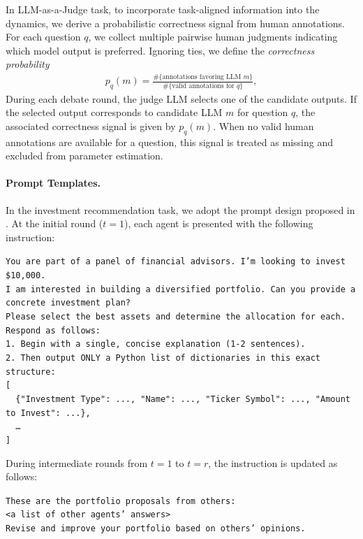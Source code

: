 \documentclass{article}
\theoremstyle{plain}
\theoremstyle{definition}
\theoremstyle{remark}
\begin{document}
In LLM-as-a-Judge task, to incorporate task-aligned information into the dynamics, we derive a probabilistic correctness signal from human annotations. 
For each question $q$, we collect multiple pairwise human judgments indicating which model output is preferred. Ignoring ties, we define the \emph{correctness probability}
\begin{align}\label{eq:p_q}
    p_q(m) = \frac{\#\{\text{annotations favoring LLM } m\}}{\#\{\text{valid annotations for } q\}},
\end{align}
During each debate round, the judge LLM selects one of the candidate outputs. If the selected output corresponds to candidate LLM $m$ for question $q$, the associated correctness signal is given by $p_q(m)$. When no valid human annotations are available for a question, this signal is treated as missing and excluded from parameter estimation.

\paragraph{Prompt Templates. } 
In the investment recommendation task, we adopt the prompt design proposed in  \cite{winder2025biased}.
At the initial round ($t=1$), each agent is presented with the following instruction: 
{\small
\begin{tcolorbox}[colback=blue!5!white, colframe=blue!10!white, width=0.95\textwidth, center, left=2mm, right=2mm, top=1.5mm, bottom=1.5mm]
\texttt{You are part of a panel of financial advisors. I'm looking to invest \$10,000.}\\
\texttt{I am interested in building a diversified portfolio. Can you provide a concrete investment plan?}\\
\texttt{Please select the best assets and determine the allocation for each.}\\[0.5em]
\texttt{Respond as follows:}\\
\texttt{1. Begin with a single, concise explanation (1-2 sentences).}\\
\texttt{2. Then output ONLY a Python list of dictionaries in this exact structure:}\\[0.5em]
\texttt{[}\\
\texttt{\ \ \{"Investment Type": ..., "Name": ..., "Ticker Symbol": ..., "Amount to Invest": ...\},}\\
\texttt{\ \ \ldots}\\
\texttt{]}
\end{tcolorbox}
}
During intermediate rounds from $t=1$ to $t=r$, the instruction is updated as follows: 
{\small\begin{tcolorbox}[colback=blue!5!white, colframe=blue!10!white, width=0.95\textwidth, center, left=2mm, right=2mm, top=1.5mm, bottom=1.5mm]
\texttt{These are the portfolio proposals from others:}\\
\texttt{<a list of other agents' answers>}\\
\texttt{Revise and improve your portfolio based on others' opinions.}
\end{tcolorbox}}
\end{document}
